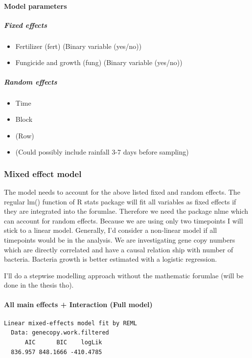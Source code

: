 \documentclass[twoside,12pt,final]{ucthesis-CA2012}
\providecommand{\tightlist}{%
  \setlength{\itemsep}{0pt}\setlength{\parskip}{0pt}}
\begin{document}
\begin{ucmainmatter}
\hypertarget{model-parameters-1}{%
\paragraph{Model parameters}\label{model-parameters-1}}

\hypertarget{fixed-effects-1}{%
\subparagraph{Fixed effects}\label{fixed-effects-1}}
\begin{itemize}
\tightlist
\item
  Fertilizer (fert) (Binary variable (yes/no))
\item
  Fungicide and growth (fung) (Binary variable (yes/no))
\end{itemize}
\hypertarget{random-effects-1}{%
\subparagraph{Random effects}\label{random-effects-1}}
\begin{itemize}
\tightlist
\item
  Time
\item
  Block
\item
  (Row)
\item
  (Could possibly include rainfall 3-7 days before sampling)
\end{itemize}
\hypertarget{mixed-effect-model-1}{%
\subsubsection{Mixed effect model}\label{mixed-effect-model-1}}

The model needs to account for the above listed fixed and random effects. The regular lm() function of R stats package will fit all variables as fixed effects if they are integrated into the forumlae. Therefore we need the package nlme which can account for random effects. Because we are using only two timepoints I will stick to a linear model. Generally, I'd consider a non-linear model if all timepoints would be in the analysis. We are investigating gene copy numbers which are directly correlated and have a causal relation ship with number of bacteria. Bacteria growth is better estimated with a logistic regression.

I'll do a stepwise modelling approach without the mathematic forumlae (will be done in the thesis tho).

\hypertarget{all-main-effects-interaction-full-model-1}{%
\paragraph{All main effects + Interaction (Full model)}\label{all-main-effects-interaction-full-model-1}}
\begin{verbatim}
Linear mixed-effects model fit by REML
  Data: genecopy.work.filtered 
      AIC      BIC    logLik
  836.957 848.1666 -410.4785


\end{verbatim}
\end{ucmainmatter}
\end{document}
